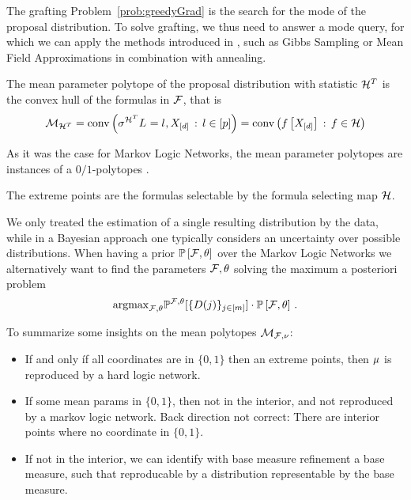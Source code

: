 The grafting Problem~\eqref{prob:greedyGrad} is the search for the mode of the proposal distribution.
To solve grafting, we thus need to answer a mode query, for which we can apply the methods introduced in , such as Gibbs Sampling or Mean Field Approximations in combination with annealing.



The mean parameter polytope of the proposal distribution with statistic $\mathcal{H}^T$ is the convex hull of the formulas in $\mathcal{F}$, that is
\begin{align*}
    \mathcal{M}_{\mathcal{H}^T}
    = \mathrm{conv}\left(\sigma^{\mathcal{H}^T}{L_{}=l_{},X_{[d]}} \, : \, l\in[p]\right)
    = \mathrm{conv}\left(f\left[X_{[d]}\right] \, : \, f\in\mathcal{H}\right)
\end{align*}


As it was the case for Markov Logic Networks, the mean parameter polytopes are instances of a $0/1$-polytopes \cite{ziegler_lectures_2000,gillmann_01-polytopes_2007}.

The extreme points are the formulas selectable by the formula selecting map $\mathcal{H}$.



\begin{remark}
    We only treated the estimation of a single resulting distribution by the data, while in a Bayesian approach one typically considers an uncertainty over possible distributions.
    When having a prior $\mathbb{P}\left[\mathcal{F},\theta\right]$ over the Markov Logic Networks we alternatively want to find the parameters $\mathcal{F},\theta$ solving the maximum a posteriori problem
    \begin{align}
        \mathrm{argmax}_{\mathcal{F},\theta} \mathbb{P}^{\mathcal{F},\theta}[\{D(j)\}_{j\in[m]}]\cdot \mathbb{P}\left[\mathcal{F},\theta\right]\, .
    \end{align}
\end{remark}

To summarize some insights on the mean polytopes $\mathcal{M}_{\mathcal{F},\nu}$:
\begin{itemize}
    \item If and only íf all coordinates are in $\{0,1\}$ then an extreme points, then $\mu$ is reproduced by a hard logic network.
    \item If some mean params in $\{0,1\}$, then not in the interior, and not reproduced by a markov logic network.
    Back direction not correct: There are interior points where no coordinate in $\{0,1\}$.
    \item If not in the interior, we can identify with base measure refinement a base measure, such that reproducable by a distribution representable by the base measure.
\end{itemize}


